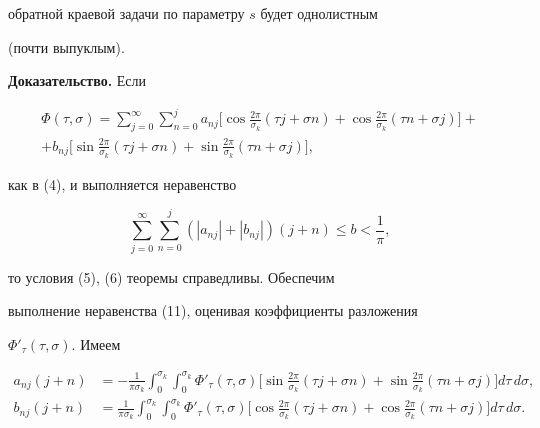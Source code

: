 обратной краевой задачи по параметру $s$ будет однолистным 


(почти выпуклым).


\medskip





{\bf Доказательство.} Если


\begin{multline*}


\Phi(\tau,\sigma) = \sum_{j = 0}^{\infty} \sum_{n = 0}^j


a_{nj}\bigg[\cos\frac{2\pi}{\sigma_k} (\tau j + \sigma n) +


\cos\frac{2\pi}{\sigma_k} (\tau n + \sigma j)\bigg] + \\


%


+b_{nj}\bigg[\sin\frac{2\pi}{\sigma_k} (\tau j + \sigma n) +


\sin\frac{2\pi}{\sigma_k} (\tau n + \sigma j)\bigg],


\end{multline*}


как в (4), и выполняется неравенство


\begin{equation}


\sum_{j = 0}^{\infty} \sum_{n = 0}^j (|a_{nj}| + |b_{nj}|)(j + n)


\leq b < \frac{1}{\pi},


\end{equation}


то условия (5), (6) теоремы справедливы. Обеспечим


выполнение неравенства (11), оценивая коэффициенты разложения


$\Phi'_{\tau}(\tau,\sigma)$. Имеем


\begin{align*}


a_{nj} (j + n) &= -\frac{1}{\pi\sigma_k} \int_0^{\sigma_k}


\int_0^{\sigma_k} \Phi'_{\tau} (\tau,\sigma)\bigg[\sin


\frac{2\pi}{\sigma_k} (\tau j + \sigma n) +


\sin \frac{2\pi}{\sigma_k} (\tau n + \sigma j)\bigg] d\tau\, d\sigma,\\


%


b_{nj} (j + n) &= \frac{1}{\pi\sigma_k} \int_0^{\sigma_k}


\int_0^{\sigma_k} \Phi'_{\tau} (\tau,\sigma)\bigg[\cos


\frac{2\pi}{\sigma_k} (\tau j + \sigma n) +


\cos \frac{2\pi}{\sigma_k} (\tau n + \sigma j)\bigg] d\tau\, d\sigma.


\end{align*}


